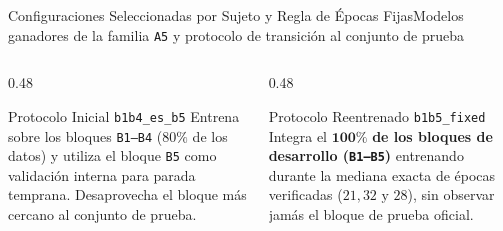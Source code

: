 \begin{frame}{Configuraciones Seleccionadas por Sujeto y Regla de \'Epocas Fijas}{Modelos ganadores de la familia \texttt{A5} y protocolo de transici\'on al conjunto de prueba \cite{rodas_valencia_tpe_ecog}}
  \vspace{1.5mm}
  \begin{columns}[T,onlytextwidth]
    \begin{column}{0.48\textwidth}
      \begin{block}{Protocolo Inicial \texttt{b1b4\_es\_b5}}
        \scriptsize
        Entrena sobre los bloques \texttt{B1--B4} ($80\%$ de los datos) y utiliza el bloque \texttt{B5} como validaci\'on interna para parada temprana. Desaprovecha el bloque m\'as cercano al conjunto de prueba.
      \end{block}
    \end{column}
    \begin{column}{0.48\textwidth}
      \begin{alertblock}{Protocolo Reentrenado \texttt{b1b5\_fixed}}
        \scriptsize
        Integra el $\mathbf{100\%}$ \textbf{de los bloques de desarrollo (\texttt{B1--B5})} entrenando durante la mediana exacta de \'epocas verificadas ($21, 32\text{ y }28$), sin observar jam\'as el bloque de prueba oficial.
      \end{alertblock}
    \end{column}
  \end{columns}
\end{frame}

